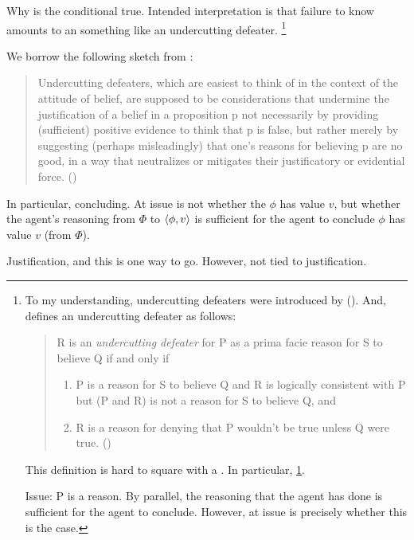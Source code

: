 \begin{note}
  Why is the conditional true.
  Intended interpretation is that failure to know \fc{} amounts to an something like an undercutting defeater.%
  \footnote{
    To my understanding, undercutting defeaters were introduced by \citeauthor{Pollock:1987un} (\citeyear{Pollock:1987un}).
    And, \citeauthor{Pollock:1987un} defines an undercutting defeater as follows:
    \begin{quote}
    R is an \emph{undercutting defeater} for P as a prima facie reason for S to believe Q if and only if
    \begin{enumerate}[label=(UD\arabic*), ref=(UD\arabic*)]
    \item
      \label{pollock:ud:1}
      P is a reason for S to believe Q and R is logically consistent with P but (P and R) is not a reason for S to believe Q, and
    \item
      \label{pollock:ud:2}
      R is a reason for denying that P wouldn't be true unless Q were true.%
      \mbox{}\hfill\mbox{(\citeyear[485]{Pollock:1987un})}
    \end{enumerate}
  \end{quote}
  This definition is hard to square with a \requ{}.
  In particular, \ref{pollock:ud:1}.

  Issue: P is a reason.
  By parallel, the reasoning that the agent has done is sufficient for the agent to conclude.
  However, at issue is precisely whether this is the case.
  }

  We borrow the following sketch from \textcite{Worsnip:2018aa}:
  \begin{quote}
    Undercutting defeaters, which are easiest to think of in the context of the attitude of belief, are supposed to be considerations that undermine the justification of a belief in a proposition p not necessarily by providing (sufficient) positive evidence to think that p is false, but rather merely by suggesting (perhaps misleadingly) that one’s reasons for believing p are no good, in a way that neutralizes or mitigates their justificatory or evidential force.%
    \mbox{}\hfill\mbox{(\citeyear[29]{Worsnip:2018aa})}
  \end{quote}

  In particular, concluding.
  At issue is not whether the \(\phi\) has value \(v\), but whether the agent's reasoning from \(\Phi\) to \(\langle \phi, v \rangle\) is sufficient for the agent to conclude \(\phi\) has value \(v\) (from \(\Phi\)).

  Justification, and this is one way to go.
  However, not tied to justification.
\end{note}

